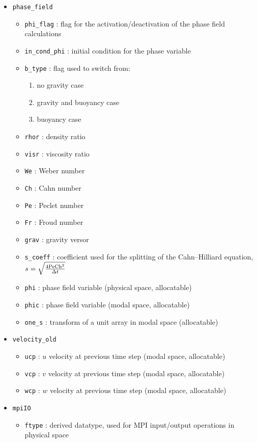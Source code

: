\begin{itemize}
\begin{itemize}
\end{itemize}
\item \texttt{phase\_field}
\begin{itemize}
\item \texttt{phi\_flag} : flag for the activation/deactivation of the phase field calculations
\item \texttt{in\_cond\_phi} : initial condition for the phase variable
\item \texttt{b\_type} : flag used to switch from:
\begin{enumerate}
\item no gravity case
\item gravity and buoyancy case
\item buoyancy case
\end{enumerate}
\item \texttt{rhor} : density ratio
\item \texttt{visr}  : viscosity ratio
\item \texttt{We} : Weber number
\item \texttt{Ch} : Cahn number
\item \texttt{Pe} : Peclet number
\item \texttt{Fr} : Froud number
\item \texttt{grav} : gravity versor
\item \texttt{s\_coeff} : coefficient used for the splitting of the Cahn--Hilliard equation, $s=\sqrt{\frac{4\textnormal{Pe}\textnormal{Ch}^2}{\Delta t}}$
\item \texttt{phi} : phase field variable (physical space, allocatable)
\item \texttt{phic} : phase field variable (modal space, allocatable)
\item \texttt{one\_s} : transform of a unit array in modal space (allocatable)
\end{itemize}
\item \texttt{velocity\_old}
\begin{itemize}
\item \texttt{ucp} : $u$ velocity at previous time step (modal space, allocatable)
\item \texttt{vcp} : $v$ velocity at previous time step (modal space, allocatable)
\item \texttt{wcp} : $w$ velocity at previous time step (modal space, allocatable)
\end{itemize}
\item \texttt{mpiIO}
\begin{itemize}
\item \texttt{ftype} : derived datatype, used for MPI input/output operations in physical space

\end{itemize}
\end{itemize}
